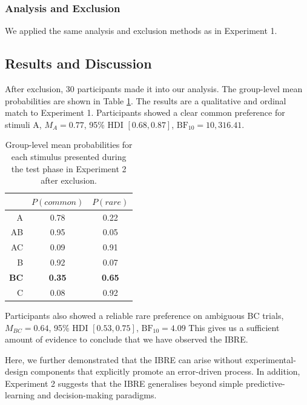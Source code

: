 \documentclass[10pt,letterpaper]{article}
\begin{document}
\subsubsection{Analysis and Exclusion}

We applied the same analysis and exclusion methods as in Experiment 1.

\subsection{Results and Discussion}

After exclusion, 30 participants made it into our analysis.
The group-level mean probabilities are shown in Table \ref{tab:results-exp2}.
The results are a qualitative and ordinal match to Experiment 1.
Participants showed a clear common preference for stimuli A, $M_{A} = 0.77$, 95\% HDI $[0.68, 0.87]$, $\mathrm{BF}_{10} = 10,316.41$.

\begin{table}[H]
  \begin{center}
    \caption{Group-level mean probabilities for each stimulus presented during the test phase in Experiment 2 after exclusion.\\}
    \label{tab:results-exp2}
    \vskip 0.12in
    \begin{tabular}{rcc}
      \hline
       & $P(common)$ & $P(rare)$ \\
      \hline
      A & 0.78 & 0.22  \\
      AB & 0.95 & 0.05 \\
      AC & 0.09 & 0.91 \\
      B & 0.92 & 0.07  \\
      \textbf{BC} & \textbf{0.35} & \textbf{0.65} \\
      C & 0.08 & 0.92 \\
    \end{tabular}
  \end{center}
\end{table}

Participants also showed a reliable rare preference on ambiguous BC trials, $M_{BC} = 0.64$, 95\% HDI $[0.53, 0.75]$, $\mathrm{BF}_{10} = 4.09$
This gives us a sufficient amount of evidence to conclude that we have observed the IBRE.

Here, we further demonstrated that the IBRE can arise without experimental-design components that explicitly promote an error-driven process.
In addition, Experiment 2 suggests that the IBRE generalises beyond simple predictive-learning \cite{kruschke1996base,don2021hearing} and decision-making \cite{johansen2007paradoxical} paradigms.
\end{document}
